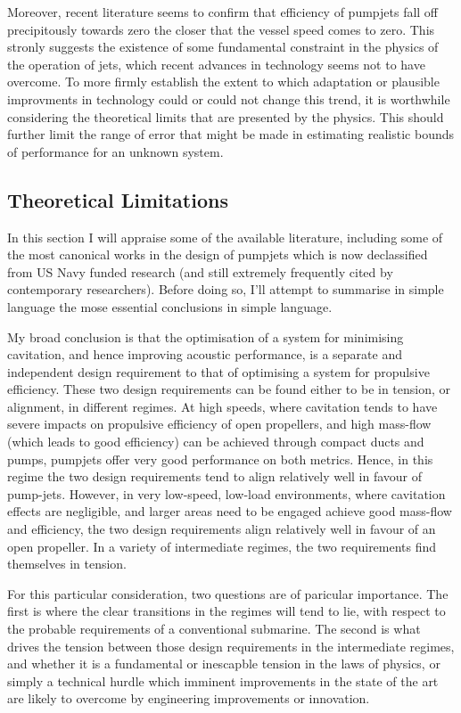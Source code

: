 \documentclass{article}\usepackage[]{graphicx}\usepackage[]{color}
\begin{document}
Moreover, recent literature seems to confirm that efficiency of pumpjets fall off precipitously towards zero the closer that the vessel speed comes to zero.  This stronly suggests the existence of some fundamental constraint in the physics of the operation of jets, which recent advances in technology seems not to have overcome.  To more firmly establish the extent to which adaptation or plausible improvments in technology could or could not change this trend, it is worthwhile considering the theoretical limits that are presented by the physics.  This should further limit the range of error that might be made in estimating realistic bounds of performance for an unknown system.

\subsection{Theoretical Limitations}
In this section I will appraise some of the available literature, including some of the most canonical works in the design of pumpjets which is now declassified from US Navy funded research (and still extremely frequently cited by contemporary researchers).  Before doing so, I'll attempt to summarise in simple language the mose essential conclusions in simple language.

My broad conclusion is that the optimisation of a system for minimising cavitation, and hence improving acoustic performance, is a separate and independent design requirement to that of optimising a system for propulsive efficiency.  These two design requirements can be found either to be in tension, or alignment, in different regimes.  At high speeds, where cavitation tends to have severe impacts on propulsive efficiency of open propellers, and high mass-flow (which leads to good efficiency) can be achieved through compact ducts and pumps, pumpjets offer very good performance on both metrics.  Hence, in this regime the two design requirements tend to align relatively well in favour of pump-jets.  However, in very low-speed, low-load environments, where cavitation effects are negligible, and larger areas need to be engaged achieve good mass-flow and efficiency, the two design requirements align relatively well in favour of an open propeller.  In a variety of intermediate regimes, the two requirements find themselves in tension.

For this particular consideration, two questions are of paricular importance.  The first is where the clear transitions in the regimes will tend to lie, with respect to the probable requirements of a conventional submarine.  The second is what drives the tension between those design requirements in the intermediate regimes, and whether it is a fundamental or inescapble tension in the laws of physics, or simply a technical hurdle which imminent improvements in the state of the art are likely to overcome by engineering improvements or innovation.
\end{document}
